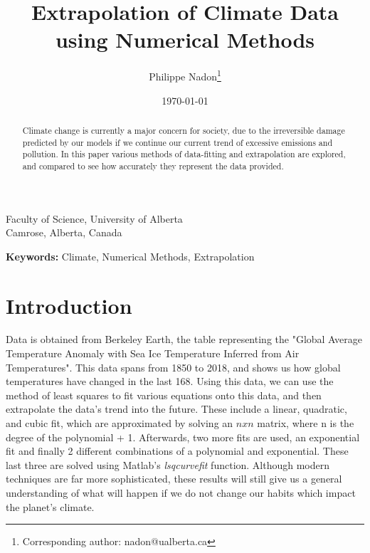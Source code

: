 \documentclass[11pt]{article}
\begin{document}
\title{Extrapolation of Climate Data using Numerical Methods}
\author{Philippe Nadon\footnote{Corresponding author: nadon@ualberta.ca}}

\date{ \today}
\maketitle

{\small Faculty of Science, University of Alberta}\\
{\small Camrose, Alberta, Canada}\\[0.5cm]

\thispagestyle{empty}

\doublespacing

\begin{abstract}
Climate change is currently a major concern for society, due to the irreversible damage predicted by our models if we continue our current trend of excessive emissions and pollution. In this paper various methods of data-fitting and extrapolation are explored, and compared to see how accurately they represent the data provided.

\end{abstract}

\textbf{Keywords:} Climate, Numerical Methods, Extrapolation

\newpage

\setcounter{page}{1}

\section{Introduction}
Data is obtained from Berkeley Earth, the table representing the "Global Average Temperature Anomaly with Sea Ice Temperature Inferred from Air Temperatures". This data spans from 1850 to 2018, and shows us how global temperatures have changed in the last 168. Using this data, we can use the method of least squares to fit various equations onto this data, and then extrapolate the data's trend into the future. These include a linear, quadratic, and cubic fit, which are approximated by solving an $nxn$ matrix, where n is the degree of the polynomial + 1. Afterwards, two more fits are used, an exponential fit and finally 2 different combinations of a polynomial and exponential. These last three are solved using Matlab's \textit{lsqcurvefit} function. Although modern techniques are far more sophisticated, these results will still give us a general understanding of what will happen if we do not change our habits which impact the planet's climate.
\end{document}
